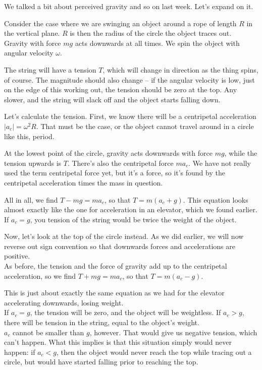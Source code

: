 We talked a bit about perceived gravity and so on last week. Let's expand on it.

Consider the case where we are swinging an object around a rope of length $R$ in the vertical plane. $R$ is then the radius of the circle the object traces out.\\
Gravity with force $m g$ acts downwards at all times. We spin the object with angular velocity $\omega$.

The string will have a tension $T$, which will change in direction as the thing spins, of course. The magnitude should also change -- if the angular velocity is low, just on the edge of this working out, the tension should be zero at the top. Any slower, and the string will slack off and the object starts falling down.

Let's calculate the tension. First, we know there will be a centripetal acceleration $|a_c| = \omega^2 R$. That must be the case, or the object cannot travel around in a circle like this, period.

At the lowest point of the circle, gravity acts downwards with force $m g$, while the tension upwards is $T$. There's also the centripetal force $m a_c$. We have not really used the term centripetal force yet, but it's a force, so it's found by the centripetal acceleration times the mass in question.

All in all, we find $T - mg = m a_c$, so that $T = m(a_c + g)$. This equation looks almost exactly like the one for acceleration in an elevator, which we found earlier. If $a_c = g$, you tension of the string would be twice the weight of the object.

Now, let's look at the top of the circle instead. As we did earlier, we will now reverse out sign convention so that downwards forces and accelerations are positive.\\
As before, the tension and the force of gravity add up to the centripetal acceleration, so we find $T + m g = m a_c$, so that $T = m(a_c - g)$.

This is just about exactly the same equation as we had for the elevator accelerating downwards, losing weight.\\
If $a_c = g$, the tension will be zero, and the object will be weightless. If $a_c > g$, there will be tension in the string, equal to the object's weight.\\
$a_c$ cannot be smaller than $g$, however. That would give us negative tension, which can't happen. What this implies is that this situation simply would never happen: if $a_c < g$, then the object would never reach the top while tracing out a circle, but would have started falling prior to reaching the top.

